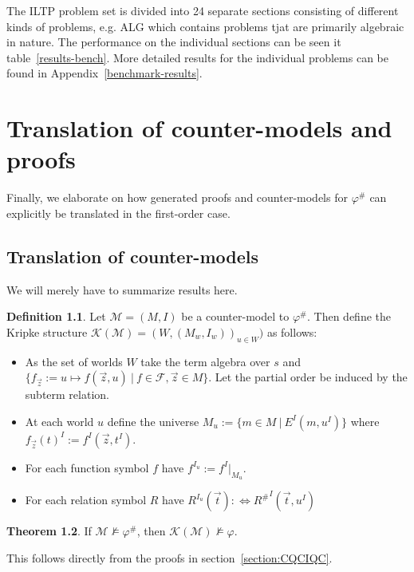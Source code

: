 \documentclass[a4paper,11pt]{report}
\theoremstyle{definition}
\newtheorem{theorem}{Theorem}[section]
\theoremstyle{definition}
\theoremstyle{definition}
\theoremstyle{definition}
\theoremstyle{definition}
\newtheorem{definition}[theorem]{Definition}
\theoremstyle{definition}
\theoremstyle{definition}
\begin{document}
	The ILTP problem set is divided into 24 separate sections consisting of different kinds of problems, e.g. ALG which contains problems tjat are primarily algebraic in nature. The performance on the individual sections can be seen it table~\ref{results-bench}.
	More detailed results for the individual problems can be found in Appendix~\ref{benchmark-results}.
	
	\chapter{Translation of counter-models and proofs}	

	Finally, we elaborate on how generated proofs and counter-models for $\varphi^\#$ can explicitly be translated in the first-order case.
	
	\section{Translation of counter-models}
	 
	We will merely have to summarize results here.
	
	\begin{definition}
		Let $\mathcal M = (M, I)$ be a counter-model to $\varphi^\#$. Then define the Kripke structure $\mathcal K(\mathcal M) = (W, (M_w, I_w))_{u\in W})$ as follows:
		\begin{itemize}
			\item As the set of worlds $W$ take the term algebra over $s$ and $\{f_{\vec{z}} := u\mapsto f(\vec z, u)\:|\:f\in\mathcal F, \vec z\in M\}$. Let the partial order be induced by the subterm relation.
			\item At each world $u$ define the universe $M_u := \{m\in M\:|\:E^I(m, u^I)\}$ where $f_{\vec z}(t)^I := f^I(\vec z, t^I)$.
			\item For each function symbol $f$ have $f^{I_u} := f^I|_{M_u}$.
			\item For each relation symbol $R$ have $R^{I_u}(\vec t) :\Leftrightarrow {R^\#}^I(\vec t, u^I)$
		\end{itemize}
	\end{definition}
		
	\begin{theorem}
		If $\mathcal M\not\models\varphi^\#$, then $ \mathcal K(\mathcal M)\not\models\varphi$.
	\end{theorem}
	
	This follows directly from the proofs in section~\ref{section:CQCIQC}.
	
\end{document}

